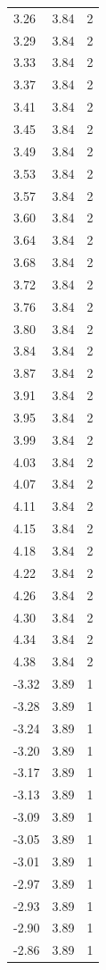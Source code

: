 \begin{longtable}{lrr}
  3.26 & 3.84 & 2 \\
  3.29 & 3.84 & 2 \\
  3.33 & 3.84 & 2 \\
  3.37 & 3.84 & 2 \\
  3.41 & 3.84 & 2 \\
  3.45 & 3.84 & 2 \\
  3.49 & 3.84 & 2 \\
  3.53 & 3.84 & 2 \\
  3.57 & 3.84 & 2 \\
  3.60 & 3.84 & 2 \\
  3.64 & 3.84 & 2 \\
  3.68 & 3.84 & 2 \\
  3.72 & 3.84 & 2 \\
  3.76 & 3.84 & 2 \\
  3.80 & 3.84 & 2 \\
  3.84 & 3.84 & 2 \\
  3.87 & 3.84 & 2 \\
  3.91 & 3.84 & 2 \\
  3.95 & 3.84 & 2 \\
  3.99 & 3.84 & 2 \\
  4.03 & 3.84 & 2 \\
  4.07 & 3.84 & 2 \\
  4.11 & 3.84 & 2 \\
  4.15 & 3.84 & 2 \\
  4.18 & 3.84 & 2 \\
  4.22 & 3.84 & 2 \\
  4.26 & 3.84 & 2 \\
  4.30 & 3.84 & 2 \\
  4.34 & 3.84 & 2 \\
  4.38 & 3.84 & 2 \\
  -3.32 & 3.89 & 1 \\
  -3.28 & 3.89 & 1 \\
  -3.24 & 3.89 & 1 \\
  -3.20 & 3.89 & 1 \\
  -3.17 & 3.89 & 1 \\
  -3.13 & 3.89 & 1 \\
  -3.09 & 3.89 & 1 \\
  -3.05 & 3.89 & 1 \\
  -3.01 & 3.89 & 1 \\
  -2.97 & 3.89 & 1 \\
  -2.93 & 3.89 & 1 \\
  -2.90 & 3.89 & 1 \\
  -2.86 & 3.89 & 1 \\

\end{longtable}
